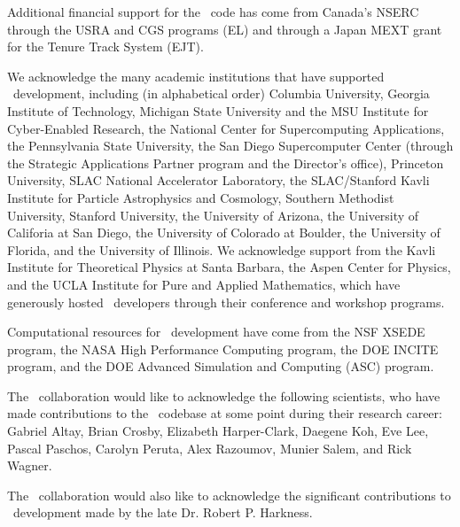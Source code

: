 Additional financial support for the \enzo\ code has come from
Canada's NSERC through the USRA and CGS programs (EL) and through a 
Japan MEXT grant for the Tenure Track System (EJT).

We acknowledge the  many academic institutions that have supported \enzo\
development, including (in alphabetical order)
Columbia University,
Georgia Institute of Technology,
Michigan State University and the MSU Institute for Cyber-Enabled
Research, 
the National Center for Supercomputing Applications, 
the Pennsylvania State University,
 the San Diego Supercomputer Center (through the Strategic Applications
Partner program and the Director’s office),
Princeton University,
SLAC National Accelerator Laboratory,
the SLAC/Stanford Kavli Institute for Particle
Astrophysics and Cosmology,  
Southern Methodist University,
Stanford University,
the University of Arizona,
the University of Califoria at San Diego, 
the University of Colorado at Boulder,
the University of Florida,
and the University of Illinois.
We acknowledge support from the Kavli Institute for Theoretical
Physics at Santa Barbara, the Aspen Center for Physics, and the UCLA
Institute for Pure and Applied Mathematics, which have
generously hosted \enzo\ developers through their conference and
workshop programs.

Computational resources for \enzo\ development have come from the NSF
XSEDE program, the NASA High Performance Computing program, the DOE INCITE
program, and the DOE Advanced Simulation and Computing (ASC) program.

The \enzo\ collaboration would like to acknowledge the following
scientists, who have made contributions to the \enzo\ codebase at some
point during their research career: Gabriel Altay, Brian Crosby,
Elizabeth Harper-Clark, Daegene Koh, Eve Lee, Pascal Paschos, Carolyn
Peruta, Alex Razoumov, Munier Salem, and Rick Wagner.

The \enzo\ collaboration would also like to acknowledge the significant contributions to
\enzo\ development made by the late Dr. Robert P. Harkness. 

